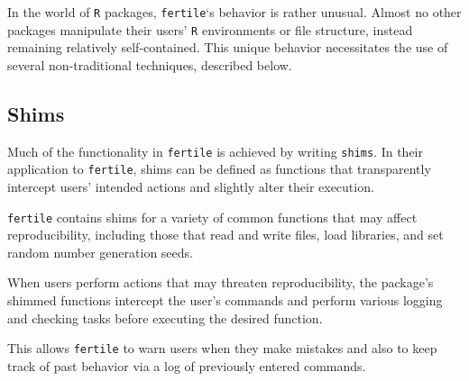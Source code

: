 \documentclass[12pt,twoside]{reedthesis}
\begin{document}
In the world of \texttt{R} packages, \texttt{fertile}`s behavior is rather unusual. Almost no other packages manipulate their users' \texttt{R} environments or file structure, instead remaining relatively self-contained. This unique behavior necessitates the use of several non-traditional techniques, described below.

\hypertarget{shims}{%
\subsection{Shims}\label{shims}}

Much of the functionality in \texttt{fertile} is achieved by writing \texttt{shims}. In their application to \texttt{fertile}, shims can be defined as functions that transparently intercept users' intended actions and slightly alter their execution.

\texttt{fertile} contains shims for a variety of common functions that may affect reproducibility, including those that read and write files, load libraries, and set random number generation seeds.

When users perform actions that may threaten reproducibility, the package's shimmed functions intercept the user's commands and perform various logging and checking tasks before executing the desired function.

This allows \texttt{fertile} to warn users when they make mistakes and also to keep track of past behavior via a log of previously entered commands.
\end{document}
